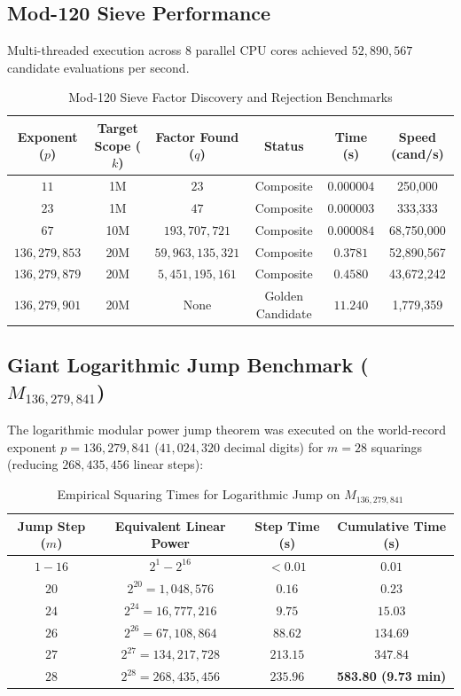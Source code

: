\documentclass[12pt,a4paper]{article}
\begin{document}
\subsection{Mod-120 Sieve Performance}
Multi-threaded execution across 8 parallel CPU cores achieved $52,890,567$ candidate evaluations per second.
\begin{table}[h]
\centering
\caption{Mod-120 Sieve Factor Discovery and Rejection Benchmarks}
\begin{tabular}{cccccc}
\toprule
Exponent ($p$) & Target Scope ($k$) & Factor Found ($q$) & Status & Time (s) & Speed (cand/s) \\
\midrule
$11$ & 1M & $23$ & Composite & $0.000004$ & 250,000 \\
$23$ & 1M & $47$ & Composite & $0.000003$ & 333,333 \\
$67$ & 10M & $193,707,721$ & Composite & $0.000084$ & 68,750,000 \\
$136,279,853$ & 20M & $59,963,135,321$ & Composite & $0.3781$ & 52,890,567 \\
$136,279,879$ & 20M & $5,451,195,161$ & Composite & $0.4580$ & 43,672,242 \\
$136,279,901$ & 20M & None & Golden Candidate & $11.240$ & 1,779,359 \\
\bottomrule
\end{tabular}
\end{table}

\subsection{Giant Logarithmic Jump Benchmark ($M_{136,279,841}$)}
The logarithmic modular power jump theorem was executed on the world-record exponent $p = 136,279,841$ ($41,024,320$ decimal digits) for $m = 28$ squarings (reducing $268,435,456$ linear steps):

\begin{table}[h]
\centering
\caption{Empirical Squaring Times for Logarithmic Jump on $M_{136,279,841}$}
\begin{tabular}{cccc}
\toprule
Jump Step ($m$) & Equivalent Linear Power & Step Time (s) & Cumulative Time (s) \\
\midrule
$1 - 16$ & $2^1 - 2^{16}$ & $< 0.01$ & $0.01$ \\
$20$ & $2^{20} = 1,048,576$ & $0.16$ & $0.23$ \\
$24$ & $2^{24} = 16,777,216$ & $9.75$ & $15.03$ \\
$26$ & $2^{26} = 67,108,864$ & $88.62$ & $134.69$ \\
$27$ & $2^{27} = 134,217,728$ & $213.15$ & $347.84$ \\
$28$ & $2^{28} = 268,435,456$ & $235.96$ & \textbf{583.80 (9.73 min)} \\
\bottomrule
\end{tabular}
\end{table}
\end{document}
